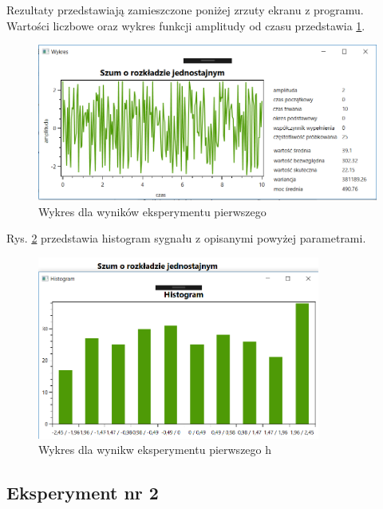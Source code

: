 \documentclass[12pt]{article}
\begin{document}
Rezultaty przedstawiają zamieszczone poniżej zrzuty ekranu z programu. Wartości liczbowe oraz wykres funkcji amplitudy od czasu przedstawia \ref{Wykres dla wynikw eksperymentu pierwszego}.
\begin{figure}[h!]
 \centering
 \includegraphics[width=12.3cm]{SzumRozkJedn.PNG}
 \vspace{-0.3cm}
 \caption{Wykres dla wyników eksperymentu pierwszego}
 \label{Wykres dla wynikw eksperymentu pierwszego}
\end{figure}

\newpage
Rys. \ref{Wykres dla wynikw eksperymentu pierwszego h} przedstawia histogram sygnału z opisanymi powyżej parametrami. 

\begin{figure}[h!]
 \centering
 \includegraphics[width=9.3cm]{SzumRozkJednHist.PNG}
 \vspace{-0.3cm}
 \caption{Wykres dla wynikw eksperymentu pierwszego h}
 \label{Wykres dla wynikw eksperymentu pierwszego h}
\end{figure}


\subsection{Eksperyment nr 2}
\end{document}
